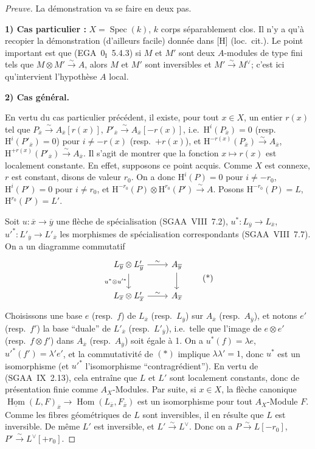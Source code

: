 \documentclass[11pt]{article}
\renewcommand{\H}{\mathrm{H}}
\DeclareMathOperator{\Hom}{Hom}
\DeclareMathOperator{\Spec}{Spec}
\newcommand{\ol}[1]{\overline{#1}}
\providecommand{\Hom}{\operatorname{Hom}}
\providecommand{\Spec}{\operatorname{Spec}}
\providecommand{\Spec}{\operatorname{Spec}}
\providecommand{\Hom}{\operatorname{Hom}}
\providecommand{\Spec}{\operatorname{Spec}}
\providecommand{\Spec}{\operatorname{Spec}}
\begin{document}
\begin{proof}[Preuve]
La démonstration va se faire en deux pas.

\textbf{1) Cas particulier :} $X = \Spec(k)$, $k$ corps séparablement clos. Il n'y a qu'à recopier la démonstration (d'ailleurs facile) donnée dans [H] (loc.~cit.). Le point important est que (EGA~$0_{\mathrm{I}}$~5.4.3) si $M$ et $M'$ sont deux $A$-modules de type fini tels que $M \otimes M' \xrightarrow{\sim} A$, alors $M$ et $M'$ sont inversibles et $M' \xrightarrow{\sim} M^{\vee}$; c'est ici qu'intervient l'hypothèse $A$ local.

\textbf{2) Cas général.}

En vertu du cas particulier précédent, il existe, pour tout $x \in X$, un entier $r(x)$ tel que $P_{\ol{x}} \xrightarrow{\sim} A_{\ol{x}}[r(x)]$, $P'_{\ol{x}} \xrightarrow{\sim} A_{\ol{x}}[-r(x)]$, i.e.~$\H^i(P_{\ol{x}}) = 0$ (resp.~$\H^i(P'_{\ol{x}}) = 0$) pour $i \neq -r(x)$ (resp.~$+r(x)$), et $\H^{-r(x)}(P_{\ol{x}}) \xrightarrow{\sim} A_{\ol{x}}$, $\H^{+r(x)}(P'_{\ol{x}}) \xrightarrow{\sim} A_{\ol{x}}$. Il s'agit de montrer que la fonction $x \mapsto r(x)$ est localement constante. En effet, supposons ce point acquis. Comme $X$ est connexe, $r$ est constant, disons de valeur $r_0$. On a donc $\H^i(P) = 0$ pour $i \neq -r_0$, $\H^i(P') = 0$ pour $i \neq r_0$, et $\H^{-r_0}(P) \otimes \H^{r_0}(P') \xrightarrow{\sim} A$. Posons $\H^{-r_0}(P) = L$, $\H^{r_0}(P') = L'$.

Soit $u : \ol{x} \to \ol{y}$ une flèche de spécialisation (SGAA~VIII~7.2), $u^{*} : L_{\ol{y}} \to L_{\ol{x}}$, $u'^{*} : L'_{\ol{y}} \to L'_{\ol{x}}$ les morphismes de spécialisation correspondants (SGAA~VIII~7.7). On a un diagramme commutatif
\begin{equation}
\begin{tikzcd}
L_{\ol{y}} \otimes L'_{\ol{y}} \arrow[r,"\sim"] \arrow[d,"u^{*} \otimes u'^{*}"'] & A_{\ol{y}} \arrow[d] \\
L_{\ol{x}} \otimes L'_{\ol{x}} \arrow[r,"\sim"] & A_{\ol{x}}
\end{tikzcd}
\tag{*}
\end{equation}
Choisissons une base $e$ (resp.~$f$) de $L_{\ol{x}}$ (resp.~$L_{\ol{y}}$) sur $A_{\ol{x}}$ (resp.~$A_{\ol{y}}$), et notons $e'$ (resp.~$f'$) la base ``duale'' de $L'_{\ol{x}}$ (resp.~$L'_{\ol{y}}$), i.e.~telle que l'image de $e \otimes e'$ (resp.~$f \otimes f'$) dans $A_{\ol{x}}$ (resp.~$A_{\ol{y}}$) soit égale à 1. On a $u^{*}(f) = \lambda e$, $u'^{*}(f') = \lambda' e'$, et la commutativité de $(*)$ implique $\lambda\lambda' = 1$, donc $u^{*}$ est un isomorphisme (et $u'^{*}$ l'isomorphisme ``contragrédient''). En vertu de (SGAA~IX~2.13), cela entraîne que $L$ et $L'$ sont localement constants, donc de présentation finie comme $A_X$-Modules. Par suite, si $x \in X$, la flèche canonique $\underline{\Hom}(L,F)_{\ol{x}} \to \Hom(L_{\ol{x}}, F_{\ol{x}})$ est un isomorphisme pour tout $A_X$-Module $F$. Comme les fibres géométriques de $L$ sont inversibles, il en résulte que $L$ est inversible. De même $L'$ est inversible, et $L' \xrightarrow{\sim} L^{\vee}$. Donc on a $P \xrightarrow{\sim} L[-r_0]$, $P' \xrightarrow{\sim} L^{\vee}[+r_0]$.


\end{proof}
\end{document}
